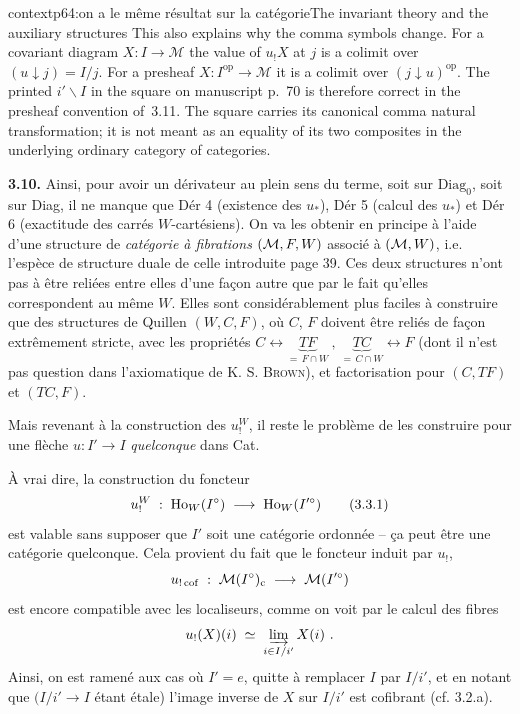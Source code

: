 \begin{dcomment}{context}{p64:on a le même résultat sur la catégorie}{The invariant theory and the auxiliary structures}
This also explains why the comma symbols change. For a covariant diagram $X:I\to\mathcal M$ the value of $u_!X$ at $j$ is a colimit over $(u\downarrow j)=I/j$. For a presheaf $X:I^{\mathrm{op}}\to\mathcal M$ it is a colimit over $(j\downarrow u)^{\mathrm{op}}$. The printed $i'\backslash I$ in the square on manuscript p.~70 is therefore correct in the presheaf convention of~3.11. The square carries its canonical comma natural transformation; it is not meant as an equality of its two composites in the underlying ordinary category of categories.
\end{dcomment}


\textbf{3.10.} Ainsi, pour avoir un dérivateur au plein sens du terme, soit sur $\mathrm{Diag}_0$, soit sur Diag, il ne manque que Dér 4 (existence des $u_*$), Dér 5 (calcul des $u_*$) et Dér 6 (exactitude des carrés $W$-cartésiens). On va les obtenir en principe à l'aide d'une structure de \textit{catégorie à fibrations} $(\mathcal{M},F,W)$ associé à $(\mathcal{M},W)$, i.e. l'espèce de structure duale de celle introduite %
page 39. Ces deux structures n'ont pas à être reliées entre elles d'une façon autre que par le fait qu'elles correspondent au même $W$. Elles sont considérablement plus faciles à construire que des structures de Quillen $(W,C,F)$, où $C$, $F$ doivent être reliés de façon extrêmement stricte, avec les propriétés $C \longleftrightarrow \underbrace{TF}_{=\,F\cap W}\ ,\ \underbrace{TC}_{=\,C\cap W} \longleftrightarrow F$ (dont il n'est pas question dans l'axiomatique de K. S. \textsc{Brown}), et factorisation pour $(C,TF)$ et $(TC,F)$.

Mais revenant à la construction des $u_!^W$, il reste le problème de les construire pour une flèche $u : I'\longrightarrow I$ \textit{quelconque} dans Cat. %

À vrai dire, la construction du foncteur
\[
u_!^W \;:\; \operatorname{Ho}_W(I^\circ) \;\longrightarrow\; \operatorname{Ho}_W(I'^\circ) \tag*{(3.3.1)}
\]
est valable sans supposer que $I'$ soit une catégorie ordonnée – ça peut être une catégorie quelconque. Cela provient du fait que le foncteur induit par $u_!$,
\[
u_{!\,\mathrm{cof}} \;:\; \mathcal{M}(I^\circ)_{\mathrm{c}} \;\longrightarrow\; \mathcal{M}(I'^\circ)
\]
est encore compatible avec les localiseurs, comme on voit par le calcul des fibres
\[
u_!(X)(i) \;\simeq\; \varinjlim_{i\in I/i'} X(i)\ . %
\]
Ainsi, on est ramené aux cas où $I' = e$, quitte à remplacer $I$ par $I/i'$, et en notant que %
$(I/i'\longrightarrow I$ étant étale) l'image inverse de $X$ sur $I/i'$ est cofibrant (cf. 3.2.a). %

